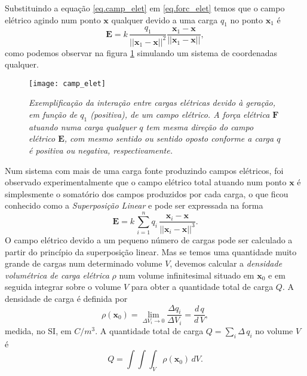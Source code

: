 Substituindo a equação \ref{eq.camp_elet} em \ref{eq.forc_elet} temos que o campo elétrico agindo num ponto $\textbf{x}$ qualquer devido a uma carga $q_1$ no ponto $\textbf{x}_1$ é
\begin{equation}\label{eq.campo_eletrico}
\textbf{E}=k\,\frac{q_1}{||\textbf{x}_1-\textbf{x}||^2}\frac{\textbf{x}_1-\textbf{x}}{||\textbf{x}_1-\textbf{x}||},
\end{equation}
como podemos observar na figura \ref{fig.camp_eletr} simulando um sistema de coordenadas qualquer.
\begin{figure}[!htb]
\centering
\texttt{[image: camp\_elet]}
\caption{\textit{Exemplificação da interação entre cargas elétricas devido à geração, em função de $q_1$ (positiva), de um campo elétrico. A força elétrica $\textbf{F}$ atuando numa carga qualquer $q$ tem mesma direção do campo elétrico $\textbf{E}$, com mesmo sentido ou sentido oposto conforme a carga $q$ é positiva ou negativa, respectivamente.}}
\label{fig.camp_eletr}
\end{figure}


Num sistema com mais de uma carga fonte produzindo campos elétricos, foi observado experimentalmente que o campo elétrico total atuando num ponto $\textbf{x}$ é simplesmente o somatório dos campos produzidos por cada carga, o que ficou conhecido como a \textit{Superposição Linear} e pode ser expressada na forma
\begin{equation*}
\textbf{E}=k\,\sum_{i=1}^{n}q_i\,\frac{\textbf{x}_i-\textbf{x}}{||\textbf{x}_i-\textbf{x}||^3}.
\end{equation*} 
O campo elétrico devido a um pequeno número de cargas pode ser calculado a partir do princípio da superposição linear. Mas se temos uma quantidade muito grande de cargas num determinado volume $V$, devemos calcular a \textit{densidade volumétrica de carga elétrica} $\rho$ num volume infinitesimal situado em $\textbf{x}_0$ e em seguida integrar sobre o volume $V$ para obter a quantidade total de carga $Q$. A densidade de carga é definida por
\begin{equation*}
\rho(\textbf{x}_0)=\lim_{\Delta V_i \to 0}\frac{\Delta q_i}{\Delta V_i}=\frac{d\,q}{d\,V},
\end{equation*}
medida, no SI, em $C/m^3$. A quantidade total de carga $Q=\sum_i \Delta\,q_i$ no volume $V$ é
\begin{equation}\label{eq.densidade_carga}
Q=\int\int\int_{V}\rho(\textbf{x}_0)\,dV.
\end{equation}

